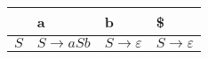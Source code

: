 \documentclass{standalone}
\begin{document}
\begin{tabularx}{\textwidth}{XXXX}
     & a & b & \$ \\
    \midrule
        \(S\)
        &
        \(S \rightarrow aSb\)
        &
        \(S \rightarrow \varepsilon\)
        &
        \(S \rightarrow \varepsilon\)
\end{tabularx}
\end{document}
